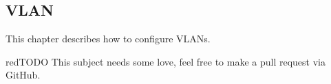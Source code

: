 \subsection{VLAN}
This chapter describes how to configure VLANs.
\begin{textbox}{red}{TODO}
This subject needs some love, feel free to make a pull request via GitHub.
\end{textbox}
